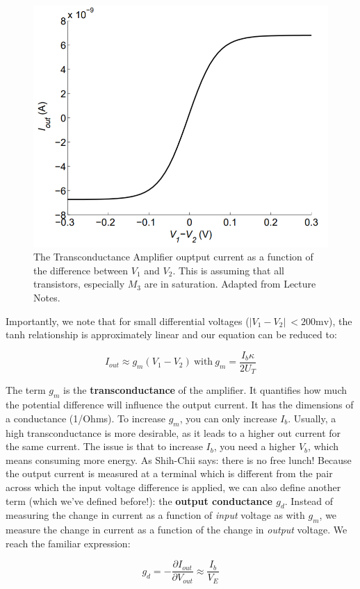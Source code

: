 \begin{figure}[H]
    \centering
    \includegraphics[width=0.5\linewidth]{../../Figures/Saturation_Transconductance_Amp.PNG}
    \caption{The Transconductance Amplifier ouptput current as a function of the difference between $V_1$ and $V_2$. This is assuming that all transistors, especially $M_3$ are in saturation. Adapted from Lecture Notes.}
    \label{fig:_saturated_transconductance_amplifier}
\end{figure}

Importantly, we note that for small differential voltages ($|V_1 - V_2|\ < 200 \textrm{mv}$), the tanh relationship is approximately linear and our equation can be reduced to: 

\begin{equation}
    I_{out} \approx g_m(V_1 - V_2) \ \mathrm{with} \ g_m = \frac{I_b \kappa}{2 U_T}
\end{equation}

The term $g_m$ is the \textbf{transconductance} of the amplifier. It quantifies how much the potential difference will influence the output current. It has the dimensions of a conductance (1/Ohms). To increase $g_m$, you can only increase $I_b$. Usually, a high transconductance is more desirable, as it leads to a higher out current for the same current. The issue is that to increase $I_b$, you need a higher $V_b$, which means consuming more energy. As Shih-Chii says: there is no free lunch!
Because the output current is measured at a terminal which is different from the pair across which the input voltage difference is applied, we can also define another term (which we've defined before!): the \textbf{output conductance $g_d$}. Instead of measuring the change in current as a function of \textit{input} voltage as with $g_m$, we measure the change in current as a function of the change in \textit{output} voltage. We reach the familiar expression: 

\begin{equation}
    g_d = - \frac{\partial I_{out}}{\partial V_{out}} \approx \frac{I_b}{V_E}
\end{equation}

